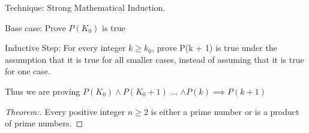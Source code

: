 \documentclass[12pt]{article}
\begin{document}
\newpage


Technique: Strong Mathematical Induction.


Base case: Prove $P(K_{0})$ is true

Inductive Step: For every integer $k \geq k_0$, prove P(k + 1) is true under the assumption that it is true for all smaller cases, instead of assuming that it is true for one case. 

Thus we are proving $P(K_0) \land P(K_0 + 1)$ ... $\land P(k) \implies P(k + 1)$

\begin{proof}[Theorem:] 
    Every positive integer $n \geq 2$ is either a prime number or is a product of prime numbers.
\end{proof}
\end{document}
